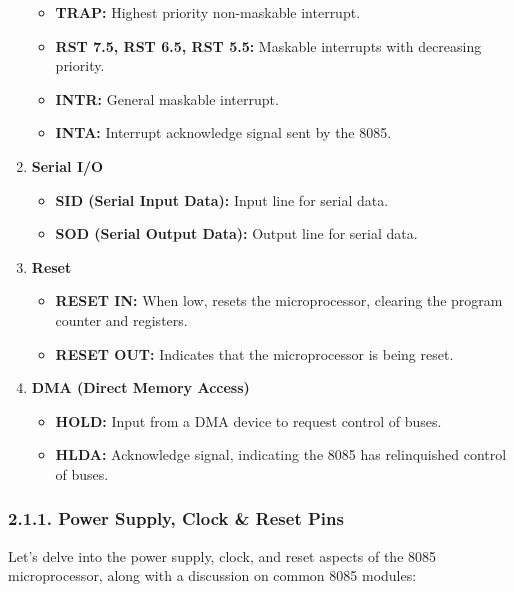 \documentclass[
]{article}
\begin{document}
\begin{enumerate}
  \begin{itemize}
  \item
    \textbf{TRAP:} Highest priority non-maskable interrupt.
  \item
    \textbf{RST 7.5, RST 6.5, RST 5.5:} Maskable interrupts with
    decreasing priority.
  \item
    \textbf{INTR:} General maskable interrupt.
  \item
    \textbf{INTA:} Interrupt acknowledge signal sent by the 8085.
  \end{itemize}
\item
  \textbf{Serial I/O}

  \begin{itemize}
  \item
    \textbf{SID (Serial Input Data):} Input line for serial data.
  \item
    \textbf{SOD (Serial Output Data):} Output line for serial data.
  \end{itemize}
\item
  \textbf{Reset}

  \begin{itemize}
  \item
    \textbf{RESET IN:} When low, resets the microprocessor, clearing the
    program counter and registers.
  \item
    \textbf{RESET OUT:} Indicates that the microprocessor is being
    reset.
  \end{itemize}
\item
  \textbf{DMA (Direct Memory Access)}

  \begin{itemize}
  \item
    \textbf{HOLD:} Input from a DMA device to request control of buses.
  \item
    \textbf{HLDA:} Acknowledge signal, indicating the 8085 has
    relinquished control of buses.
  \end{itemize}
\end{enumerate}

\hypertarget{211-power-supply-clock--reset-pins}{%
\subsubsection{2.1.1. Power Supply, Clock \& Reset
Pins}\label{211-power-supply-clock--reset-pins}}

Let's delve into the power supply, clock, and reset aspects of the 8085
microprocessor, along with a discussion on common 8085 modules:
\end{document}
